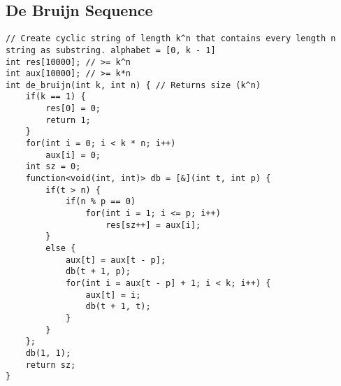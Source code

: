 \documentclass[landscape, 8pt, a4paper, oneside, twocolumn]{extarticle}
\begin{document}
\subsection{De Bruijn Sequence}
\begin{verbatim}
// Create cyclic string of length k^n that contains every length n string as substring. alphabet = [0, k - 1]
int res[10000]; // >= k^n
int aux[10000]; // >= k*n
int de_bruijn(int k, int n) { // Returns size (k^n)
	if(k == 1) {
		res[0] = 0;
		return 1;
	}
	for(int i = 0; i < k * n; i++)
		aux[i] = 0;
	int sz = 0;
	function<void(int, int)> db = [&](int t, int p) {
		if(t > n) {
			if(n % p == 0)
				for(int i = 1; i <= p; i++)
					res[sz++] = aux[i];
		}
		else {
			aux[t] = aux[t - p];
			db(t + 1, p);
			for(int i = aux[t - p] + 1; i < k; i++) {
				aux[t] = i;
				db(t + 1, t);
			}
		}
	};
	db(1, 1);
	return sz;
}
\end{verbatim}
\end{document}

